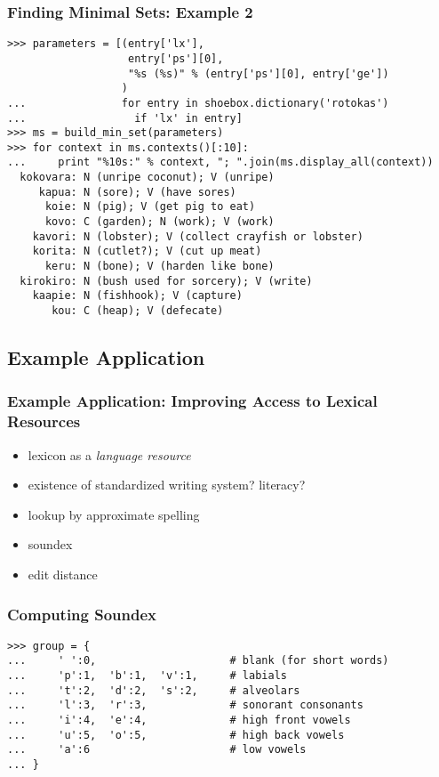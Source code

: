 \documentclass[handout]{beamer}
\begin{document}
\begin{frame}[fragile]
\frametitle{Finding Minimal Sets: Example 2}
\scriptsize

\begin{verbatim}
>>> parameters = [(entry['lx'],
                   entry['ps'][0],
                   "%s (%s)" % (entry['ps'][0], entry['ge'])
                  )
...               for entry in shoebox.dictionary('rotokas')
...                 if 'lx' in entry]
>>> ms = build_min_set(parameters)
>>> for context in ms.contexts()[:10]:
...     print "%10s:" % context, "; ".join(ms.display_all(context))
  kokovara: N (unripe coconut); V (unripe)
     kapua: N (sore); V (have sores)
      koie: N (pig); V (get pig to eat)
      kovo: C (garden); N (work); V (work)
    kavori: N (lobster); V (collect crayfish or lobster)
    korita: N (cutlet?); V (cut up meat)
      keru: N (bone); V (harden like bone)
  kirokiro: N (bush used for sorcery); V (write)
    kaapie: N (fishhook); V (capture)
       kou: C (heap); V (defecate)
\end{verbatim}
\end{frame}

\subsection{Example Application}

\begin{frame}
\frametitle{Example Application: Improving Access to Lexical Resources}
\begin{itemize}
\item lexicon as a \textit{language resource}
\item existence of standardized writing system?  literacy?
\item lookup by approximate spelling
\item soundex
\item edit distance
\end{itemize}
\end{frame}

\begin{frame}[fragile]
\frametitle{Computing Soundex}
\scriptsize

\begin{verbatim}
>>> group = {
...     ' ':0,                     # blank (for short words)
...     'p':1,  'b':1,  'v':1,     # labials
...     't':2,  'd':2,  's':2,     # alveolars
...     'l':3,  'r':3,             # sonorant consonants
...     'i':4,  'e':4,             # high front vowels
...     'u':5,  'o':5,             # high back vowels
...     'a':6                      # low vowels
... }
\end{verbatim}
\end{frame}
\end{document}
